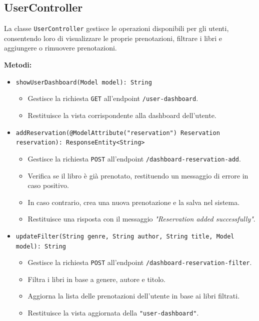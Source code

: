 \documentclass[twoside,openright,titlepage,fleqn,headinclude,12pt,a4paper,BCOR=5mm,footinclude]{scrbook}
\begin{document}
\subsection{UserController}
La classe \texttt{UserController} gestisce le operazioni disponibili per gli utenti, consentendo loro di visualizzare le proprie prenotazioni, filtrare i libri e aggiungere o rimuovere prenotazioni.

\textbf{Metodi:}  
\begin{itemize}  
   
    \item \texttt{showUserDashboard(Model model): String}  
    \begin{itemize}  
        \item Gestisce la richiesta \texttt{GET} all'endpoint \texttt{/user-dashboard}.  
        \item Restituisce la vista corrispondente alla dashboard dell'utente.  
    \end{itemize}  

    \item \texttt{addReservation(@ModelAttribute("reservation") Reservation reservation): ResponseEntity<String>}  
    \begin{itemize}  
        \item Gestisce la richiesta \texttt{POST} all’endpoint \texttt{/dashboard-reservation-add}.  
        \item Verifica se il libro è già prenotato, restituendo un messaggio di errore in caso positivo.  
        \item In caso contrario, crea una nuova prenotazione e la salva nel sistema.  
        \item Restituisce una risposta con il messaggio \textit{"Reservation added successfully"}.  
    \end{itemize}  

    \item \texttt{updateFilter(String genre, String author, String title, Model model): String}  
    \begin{itemize}  
        \item Gestisce la richiesta \texttt{POST} all'endpoint \texttt{/dashboard-reservation-filter}.  
        \item Filtra i libri in base a genere, autore e titolo.  
        \item Aggiorna la lista delle prenotazioni dell'utente in base ai libri filtrati.  
        \item Restituisce la vista aggiornata della \texttt{"user-dashboard"}.  
    \end{itemize}  


\end{itemize}
\end{document}
